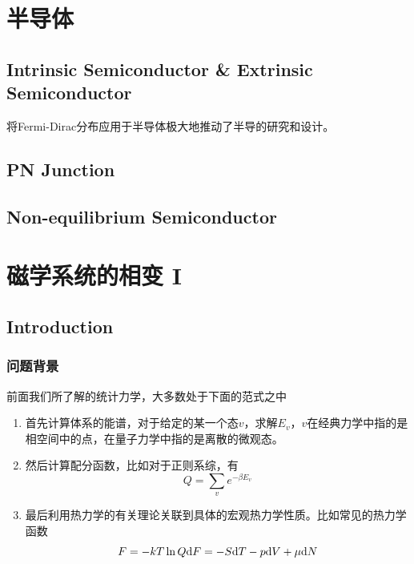 \documentclass[AutoFakeBold]{tstextbook}
\begin{document}
\chapter{半导体} %
\label{cha:半导体}
\section{Intrinsic Semiconductor \& Extrinsic Semiconductor} %
\label{sec:Intrinsic Semiconductor and Extrinsic Semiconductor}
将Fermi-Dirac分布应用于半导体极大地推动了半导的研究和设计。
\section{PN Junction} %
\label{sec:PN Junction}
\section{Non-equilibrium Semiconductor} %
\label{sec:Non-equilibrium Semiconductor}



\chapter{磁学系统的相变 I} %
\label{cha:磁学系统的相变 I}
\section{Introduction} %
\label{sec:Introduction}
\subsection{问题背景} %
\label{sub:问题背景}
前面我们所了解的统计力学，大多数处于下面的范式之中

\begin{enumerate}\setlength{\itemsep}{0pt}
    \item 首先计算体系的能谱，对于给定的某一个态$v$，求解$E_v$，$v$在经典力学中指的是相空间中的点，在量子力学中指的是离散的微观态。
    \item 然后计算配分函数，比如对于正则系综，有\begin{equation}
              Q=\sum_{v}e^{-\beta E_v}
          \end{equation}
    \item 最后利用热力学的有关理论关联到具体的宏观热力学性质。比如常见的热力学函数\begin{equation}
        F=-kT\ln Q\\
        \mathrm{d} F = -S\mathrm{d} T -p\mathrm{d} V +\mu \mathrm{d} N
    \end{equation}
\end{enumerate}
\end{document}

